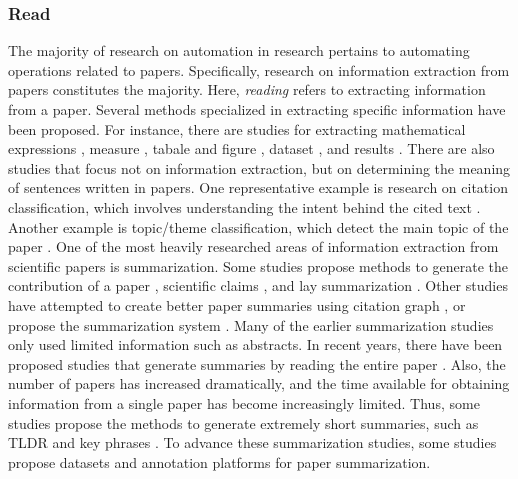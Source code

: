 \documentclass{book}
\begin{document}
\subsubsection{Read}
The majority of research on automation in research pertains to automating operations related to papers. Specifically, research on information extraction from papers constitutes the majority. Here, \textit{reading} refers to extracting information from a paper.
Several methods specialized in extracting specific information have been proposed. For instance, there are studies for extracting mathematical expressions \cite{greiner2020math,madisetty2021neural}, measure \cite{harper2021semeval,kohler2021s}, tabale and figure \cite{shen2022vila,hashmi2021current,zhuang2022resel,yamamoto2021visual}, dataset \cite{hou2019identification,kumar2021dataquest,prasad2019dataset}, and results \cite{kardas2020axcell}.
There are also studies that focus not on information extraction, but on determining the meaning of sentences written in papers. One representative example is research on citation classification, which involves understanding the intent behind the cited text \cite{pride2019act,kunnath2021meta,kunnath2022dynamic,kunnath2022act2,lauscher2021multicite}. Another example is topic/theme classification, which detect the main topic of the paper \cite{sadat2022hierarchical,mendoza2022benchmark,salatino2022cso}.
One of the most heavily researched areas of information extraction from scientific papers is summarization. Some studies propose methods to generate the contribution of a paper \cite{hayashi2020s}, scientific claims \cite{wright2022generating}, and lay summarization \cite{goldsack2022making}. Other studies have attempted to create better paper summaries using citation graph \cite{chen2022scientific,an2021enhancing}, or propose the summarization system \cite{erera2019summarization}.
Many of the earlier summarization studies only used limited information such as abstracts. In recent years, there have been proposed studies that generate summaries by reading the entire paper \cite{subramanian2019extractive,qi2022sapgraph,dong2020discourse,tretyak2020combination}.
Also, the number of papers has increased dramatically, and the time available for obtaining information from a single paper has become increasingly limited. Thus, some studies propose the methods to generate extremely short summaries, such as TLDR \cite{cachola2020tldr} and key phrases \cite{boudin2021keyphrase,garg2021keyphrase}.
To advance these summarization studies, some studies propose datasets \cite{yasunaga2019scisummnet,bastan2022sume} and annotation platforms \cite{el2022platform} for paper summarization. 
\end{document}
